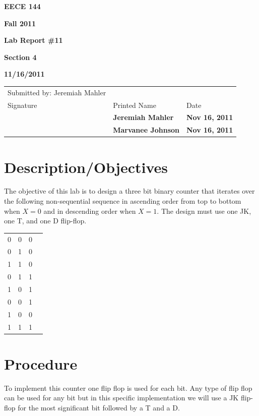 \documentclass[12pt]{article}
\begin{document}
\centerline{\bf EECE 144}
\centerline{\bf Fall 2011}
\centerline{\bf}
\centerline{\bf Lab Report \#11}
\centerline{\bf Section 4}
\centerline{\bf 11/16/2011}
\begin{center}
\begin{tabularx}{\textwidth}[b]{X l l}
Submitted by: Jeremiah Mahler & & \\
Signature & Printed Name & Date \\
\hline
\multicolumn{1}{|X|}{} & \multicolumn{1}{|l|}{\bigstrut \bf Jeremiah Mahler} & \multicolumn{1}{|l|}{\bf Nov 16, 2011} \\
\hline
\multicolumn{1}{|X|}{} & \multicolumn{1}{|l|}{\bigstrut \bf Marvanee Johnson} & \multicolumn{1}{|l|}{\bf Nov 16, 2011} \\
\hline
\end{tabularx}
\end{center}

\section{Description/Objectives}

The objective of this lab is to design a three bit binary counter
that iterates over the following non-sequential sequence
in ascending order from top to bottom when $X = 0$ and in
descending order when $X = 1$.
The design must use one JK, one T, and one D flip-flop.

\begin{center}
\begin{tabular}[t]{cccc}
0 & 0 & 0 \\
0 & 1 & 0 \\
1 & 1 & 0 \\
0 & 1 & 1 \\
1 & 0 & 1 \\
0 & 0 & 1 \\
1 & 0 & 0 \\
1 & 1 & 1 \\
\end{tabular}
\end{center}


\section{Procedure}
\label{sec:procedure}

To implement this counter one flip flop is used for each bit.
Any type of flip flop can be used for any bit but in this
specific implementation we will use a JK flip-flop for the
most significant bit followed by a T and a D.
\end{document}
